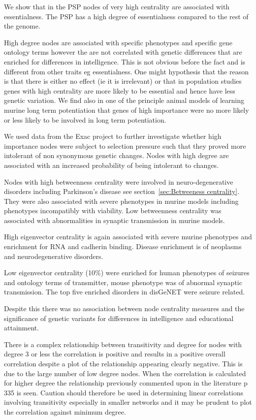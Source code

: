 We show that in the PSP nodes of very high centrality are associated with essentialness. The PSP has a high degree of essentialness compared to the rest of the genome. 

High degree nodes are associated with specific phenotypes and specific gene ontology terms however the are not correlated with genetic differences that are enriched for differences in intelligence. This is not obvious before the fact and is different from other traits eg essentialness. One might hypothesis that the reason is that there is either no effect (ie it is irrelevant) or that in population studies genes with high centrality are more likely to be essential and hence have less genetic variation. We find also in one of the principle animal models of learning murine long term potentiation that genes of high importance were no more likely or less likely to be involved in long term potentiation.

We used data from the Exac project to further investigate whether high importance nodes were subject to selection pressure such that they proved more intolerant of non synonymous genetic changes. Nodes with high degree are associated with an increased probability of being intolerant to changes. 

Nodes with high betweenness centrality were involved in neuro-degenerative disorders including Parkinson's disease see section~\ref{sec:Betweeness centrality}. They were also associated with severe phenotypes in murine models including phenotypes incompatibly with viability. Low betweenness centrality was associated with abnormalities in synaptic transmission in murine models. 

High eigenvector centrality is again associated with severe murine phenotypes and enrichment for RNA and cadherin binding. Disease enrichment is of neoplasms and neurodegenerative disorders. 

Low eigenvector centrality (10\%) were enriched for human phenotypes of seizures and ontology terms of transmitter, mouse phenotype was of abnormal synaptic transmission. The top five enriched disorders in disGeNET were seizure related. 

Despite this there was no association between node centrality measures and the significance of genetic variants for differences in intelligence and educational attainment.

There is a complex relationship between transitivity and degree for nodes with degree 3 or less the correlation is positive and results in a positive overall correlation despite a plot of the relationship appearing clearly negative. This is due to the large number of low degree nodes. When the correlation is calculated for higher degree the relationship previously commented upon in the literature \cite{newman} p 335 is seen. Caution should therefore be used in determining linear correlations involving transitivity especially in smaller networks and it may be prudent to plot the correlation against minimum degree.


